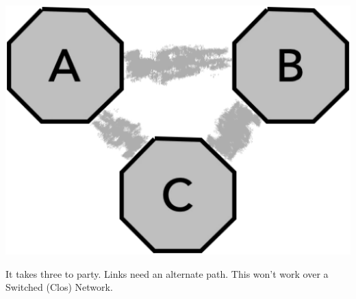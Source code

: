 \documentclass[../OAE-SPEC-MAIN.tex]{subfiles}
\begin{document}
 \begin{marginfigure}
        \includegraphics[width=\linewidth]{../../FIGURES/Tripartite-discovery.pdf}
  \caption{It takes three to party.  Links need an alternate path. This won't work over a Switched (Clos) Network.  
}
    \vspace{16pt}
\end{marginfigure}


\end{document}
